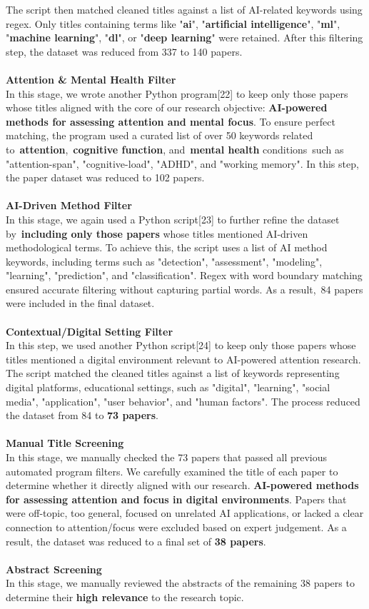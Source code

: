 \documentclass[12pt]{article}
\begin{document}
The script then matched cleaned titles against a list of AI-related keywords using regex. Only titles containing terms like "\textbf{ai}", "\textbf{artificial intelligence}", "\textbf{ml}", "\textbf{machine learning}", "\textbf{dl}", or "\textbf{deep learning}" were retained. After this filtering step, the dataset was reduced from 337 to 140 papers.
 \\ \\
\textbf{Attention \& Mental Health Filter} \\ 
In this stage, we wrote another Python program[22] to keep only those papers whose titles aligned with the core of our research objective: \textbf{AI-powered methods for assessing attention and mental focus}. To ensure perfect matching, the program used a curated list of over 50 keywords related to \textbf{attention}, \textbf{cognitive function}, and \textbf{mental health} conditions such as "attention-span", "cognitive-load", "ADHD", and "working memory". In this step, the paper dataset was reduced to 102 papers. \\ \\
\textbf{AI-Driven Method Filter} \\ 
In this stage, we again used a Python script[23]  to further refine the dataset by \textbf{including only those papers} whose titles mentioned AI-driven methodological terms. To achieve this, the script uses a list of AI method keywords, including terms such as "detection", "assessment", "modeling", "learning", "prediction", and "classification". Regex with word boundary matching ensured accurate filtering without capturing partial words. As a result, 84 papers were included in the final dataset. \\ \\
\textbf{Contextual/Digital Setting Filter} \\ 
In this step, we used another Python script[24] to keep only those papers whose titles mentioned a digital environment relevant to AI-powered attention research. The script matched the cleaned titles against a list of keywords representing digital platforms, educational settings, such as "digital", "learning", "social media", "application", "user behavior", and "human factors". The process reduced the dataset from 84 to \textbf{73 papers}. \\ \\
\textbf{Manual Title Screening} \\ 
In this stage, we manually checked the 73 papers that passed all previous automated program filters. We carefully examined the title of each paper to determine whether it directly aligned with our research. \textbf{AI-powered methods for assessing attention and focus in digital environments}. Papers that were off-topic, too general, focused on unrelated AI applications, or lacked a clear connection to attention/focus were excluded based on expert judgement. As a result, the dataset was reduced to a final set of \textbf{38 papers}. \\ \\
\textbf{Abstract Screening} \\ 
In this stage, we manually reviewed the abstracts of the remaining 38 papers to determine their \textbf{high relevance} to the research topic. 
\end{document}

